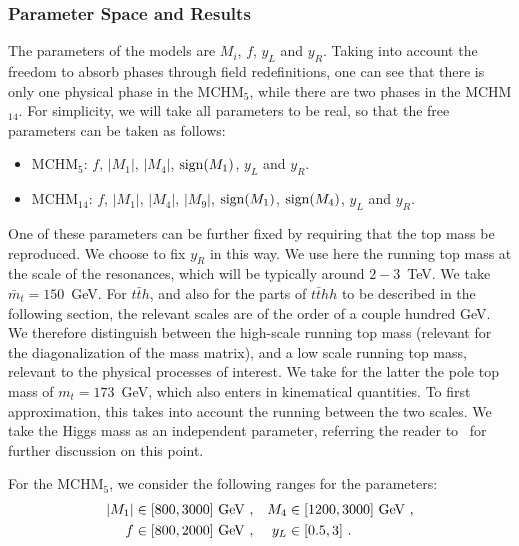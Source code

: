 \subsubsection{Parameter Space and Results}
\label{analysis}
The parameters of the models are $M_i$, $f$, $y_L$ and $y_R$.  Taking
into account the freedom to absorb phases through field redefinitions,
one can see that there is only one physical phase in the MCHM$_5$,
while there are two phases in the MCHM$_{14}$.  For simplicity, we
will take all parameters to be real, so that the free parameters can be
taken as follows:
\begin{itemize}
\item MCHM$_5$: $f$, $|M_1|$, $|M_4|$, ${\rm sign}(M_1)$, $y_L$ and $y_R$.
\item MCHM$_{14}$: $f$, $|M_1|$, $|M_4|$, $|M_9|$, ${\rm sign}(M_1)$, ${\rm sign}(M_4)$, $y_L$ and $y_R$.
\end{itemize}
One of these parameters can be further fixed by requiring that the top
mass be reproduced.  We choose to fix $y_R$ in this way.  We use here
the running top mass at the scale of the resonances, which will be
typically around $2-3$~TeV. We take $\bar{m}_t = 150$~GeV. For
$t\bar{t}h$, and also for the parts of $t\bar{t}hh$ to be described in
the following section, the relevant scales are of the order of a
couple hundred GeV. We therefore distinguish between the high-scale
running top mass (relevant for the diagonalization of the mass
matrix), and a low scale running top mass, relevant to the physical
processes of interest.  We take for the latter the pole top mass of
$m_t = 173$~GeV, which also enters in kinematical quantities.  To
first approximation, this takes into account the running between the
two scales.  We take the Higgs mass as an independent parameter,
referring the reader to~\cite{MCHMtthh} for further discussion on this
point.

For the MCHM$_5$, we consider the following ranges for the parameters:
\begin{align*}
|M_1|& \in [800, 3000]~{\rm GeV}~, &  M_4 &\in [1200, 3000]~{\rm GeV}~,  \\
f&\in [800, 2000]~{\rm GeV}~,          &  y_L&\in [0.5, 3] ~.
\end{align*}

